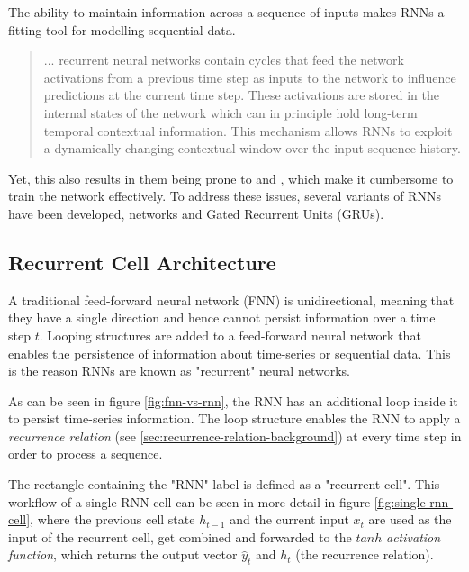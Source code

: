         The ability to maintain information across a sequence of inputs makes RNNs a fitting tool for modelling sequential data.
        \begin{quote}
            ... recurrent neural networks contain cycles that feed the network activations from a previous time step as inputs to the network to influence predictions at the current time step. These activations are stored in the internal states of the network which can in principle hold long-term temporal contextual information. This mechanism allows RNNs to exploit a dynamically changing contextual window over the input sequence history. \cite{sakLongShortTermMemory2014}
        \end{quote}
        Yet, this also results in them being prone to  and , which make it cumbersome to train the network effectively. 
        To address these issues, several variants of RNNs have been developed,  networks and Gated Recurrent Units (GRUs).
        
        
        \subsection{Recurrent Cell Architecture}
        \label{sec:recurrent-cell-architecture-background}

            A traditional feed-forward neural network (FNN) is unidirectional, meaning that they have a single direction and hence cannot persist information over a time step $t$.
            Looping structures are added to a feed-forward neural network that enables the persistence of information about time-series or sequential data. 
            This is the reason RNNs are known as "recurrent" neural networks.

            As can be seen in figure \ref{fig:fnn-vs-rnn}, the RNN has an additional loop inside it to persist time-series information. The loop structure enables the RNN to apply a \emph{recurrence relation} (see \ref{sec:recurrence-relation-background}) at every time step in order to process a sequence.

            The rectangle containing the "RNN" label is defined as a "recurrent cell".
            This workflow of a single RNN cell can be seen in more detail in figure \ref{fig:single-rnn-cell}, where the previous cell state $h_{t-1}$ and the current input $x_t$ are used as the input of the recurrent cell, get combined and forwarded to the $tanh$ \emph{activation function}, which returns the output vector $\hat{y}_t$ and $h_t$ (the recurrence relation).

